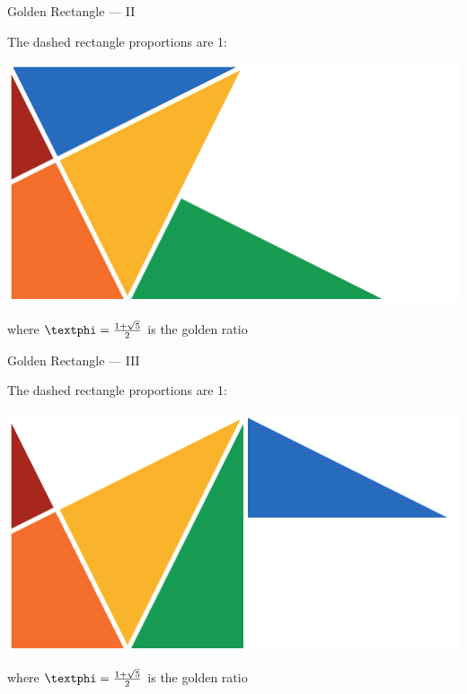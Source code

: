 \documentclass[14pt]{beamer}
\begin{document}

    \begin{frame}{Golden Rectangle --- II}
        \begin{center}
            The dashed rectangle proportions are 1:\textphi
        \end{center}
        \hspace{4.1em} \includegraphics[scale=1.0]{figures/figure030e.pdf} \\
        \begin{center}
            where $\text{\textphi} =\tfrac{1+\sqrt{5}}{2}$ is the golden ratio
        \end{center}
    \end{frame}


    \begin{frame}{Golden Rectangle --- III}
        \begin{center}
            The dashed rectangle proportions are 1:\textphi
        \end{center}
        \hspace{4.1em} \includegraphics[scale=1.0]{figures/figure030f.pdf} \\
        \begin{center}
            where $\text{\textphi} =\tfrac{1+\sqrt{5}}{2}$ is the golden ratio
        \end{center}
    \end{frame}
\end{document}
